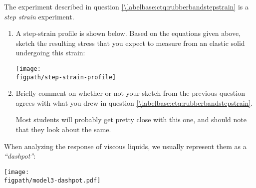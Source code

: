 \begin{activity}
\begin{infobox}
\end{infobox}

\clearpage
\begin{ctqs}
	\question The experiment described in question \ref{\labelbase:ctq:rubberbandstepstrain} is a \emph{step strain} experiment.
	
		\begin{enumerate}
			\item A step-strain profile is shown below.  Based on the equations given above, sketch the resulting stress that you expect to measure from an elastic solid undergoing this strain:
			
				\begin{solution}[3.5in]
					\vspace{6pt}
					\centerline{\texttt{[image: \\figpath/step-strain-profile]}}
					\vspace{6pt}
				\end{solution}
				
			\item Briefly comment on whether or not your sketch from the previous question agrees with what you drew in question \ref{\labelbase:ctq:rubberbandstepstrain}.
			
				\begin{solution}[2in]
					Most students will probably get pretty close with this one, and should note that they look about the same.
				\end{solution}
		\end{enumerate}
\end{ctqs}

\clearpage
\begin{model}

	When analyzing the response of viscous liquids, we usually represent them as a \emph{``dashpot''}:
	
	\vspace{3pt}
	\centerline{\texttt{[image: \\figpath/model3-dashpot.pdf]}}
	

\end{model}
\end{activity}
